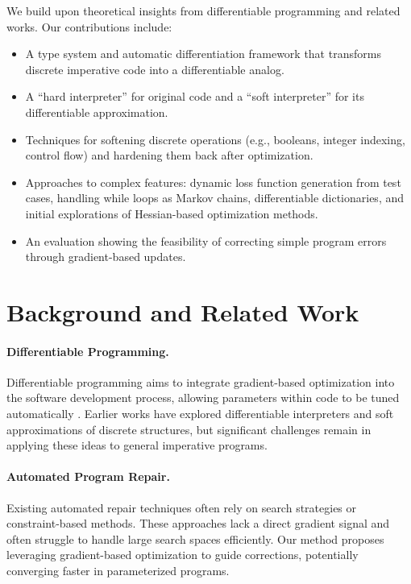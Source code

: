 \documentclass{article}
\begin{document}
We build upon theoretical insights from differentiable programming \cite{blondel2024elementsdifferentiableprogramming, DBLP:journals/corr/abs-1907-07587, vandemeulebroucke2018myia} and related works. Our contributions include:
\begin{itemize}[leftmargin=*]
    \item A type system and automatic differentiation framework that transforms discrete imperative code into a differentiable analog.
    \item A ``hard interpreter'' for original code and a ``soft interpreter'' for its differentiable approximation.
    \item Techniques for softening discrete operations (e.g., booleans, integer indexing, control flow) and hardening them back after optimization.
    \item Approaches to complex features: dynamic loss function generation from test cases, handling while loops as Markov chains, differentiable dictionaries, and initial explorations of Hessian-based optimization methods.
    \item An evaluation showing the feasibility of correcting simple program errors through gradient-based updates.
\end{itemize}

\section{Background and Related Work}
\paragraph{Differentiable Programming.} Differentiable programming aims to integrate gradient-based optimization into the software development process, allowing parameters within code to be tuned automatically \cite{blondel2024elementsdifferentiableprogramming,DBLP:journals/corr/abs-1907-07587,vandemeulebroucke2018myia}. Earlier works have explored differentiable interpreters and soft approximations of discrete structures, but significant challenges remain in applying these ideas to general imperative programs.

\paragraph{Automated Program Repair.} Existing automated repair techniques often rely on search strategies or constraint-based methods. These approaches lack a direct gradient signal and often struggle to handle large search spaces efficiently. Our method proposes leveraging gradient-based optimization to guide corrections, potentially converging faster in parameterized programs.
\end{document}
